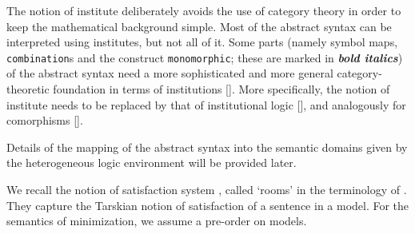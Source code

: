 \documentclass[10pt,%
\ifpretendfinal
final%
\else
draft%
\fi,
]{scrreprt}
\newcommand*{\institutionsOnly}{\bfseries\itshape}
\newcommand*{\syntax}[1]{\texttt{#1}}
\begin{document}
The notion of institute deliberately avoids the use of category theory
in order to keep the mathematical background simple.  Most of the
abstract syntax can be interpreted using institutes, but not all of
it. Some parts (namely symbol maps, \syntax{combination}s
 and the construct \syntax{monomorphic};
these are marked in {\institutionsOnly bold italics}) of the abstract
syntax need a more sophisticated and more general category-theoretic
foundation in terms of institutions [\cite{Institutions}]. More
specifically, the notion of institute needs to be replaced by that of
institutional logic [\cite{Meseguer89}], and analogously for
comorphisms [\cite{Comorphisms}].

Details of the mapping of the abstract syntax into the semantic
domains given by the heterogeneous logic environment will be provided later.







We recall the notion of satisfaction system
\cite{carnielli2008analysis}, called `rooms' in the terminology of
\cite{CharPar}. They capture the Tarskian notion of satisfaction of a
sentence in a model. For the semantics of minimization,
we assume a pre-order on models.
\end{document}
